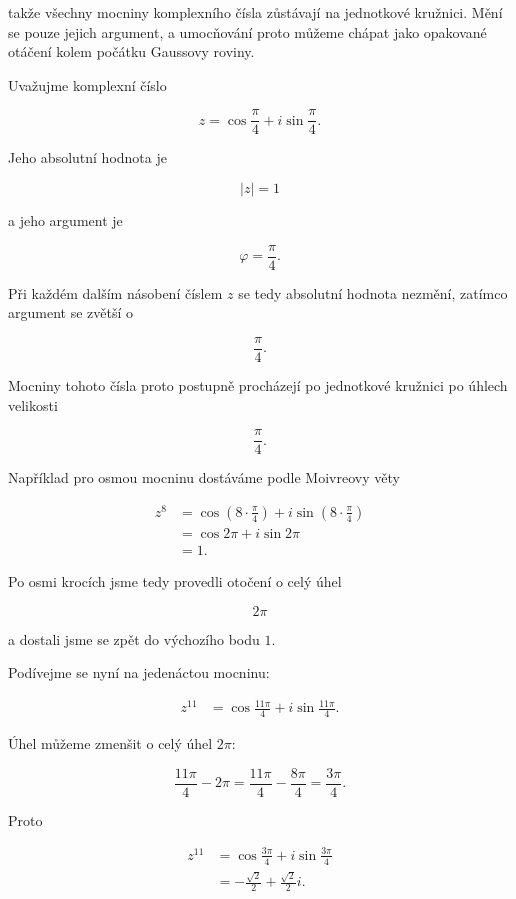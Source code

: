 \documentclass[12pt,a4paper]{article}
\begin{document}
takže všechny mocniny komplexního čísla zůstávají na jednotkové kružnici. Mění se
pouze jejich argument, a umocňování proto můžeme chápat jako opakované otáčení
kolem počátku Gaussovy roviny.


\begin{examplebox}

Uvažujme komplexní číslo

\[
    z=
    \cos\frac{\pi}{4}
    +
    i\sin\frac{\pi}{4}.
\]

Jeho absolutní hodnota je

\[
    |z|=1
\]

a jeho argument je

\[
    \varphi=\frac{\pi}{4}.
\]

Při každém dalším násobení číslem $z$ se tedy absolutní hodnota nezmění, zatímco
argument se zvětší o

\[
    \frac{\pi}{4}.
\]

Mocniny tohoto čísla proto postupně procházejí po jednotkové kružnici po úhlech
velikosti

\[
    \frac{\pi}{4}.
\]

Například pro osmou mocninu dostáváme podle Moivreovy věty

\begin{align*}
    z^8
    &=
    \cos\left(8\cdot\frac{\pi}{4}\right)
    +
    i\sin\left(8\cdot\frac{\pi}{4}\right)\\
    &=
    \cos2\pi+i\sin2\pi\\
    &=
    1.
\end{align*}

Po osmi krocích jsme tedy provedli otočení o celý úhel

\[
    2\pi
\]

a dostali jsme se zpět do výchozího bodu $1$.

Podívejme se nyní na jedenáctou mocninu:

\begin{align*}
    z^{11}
    &=
    \cos\frac{11\pi}{4}
    +
    i\sin\frac{11\pi}{4}.
\end{align*}

Úhel můžeme zmenšit o celý úhel $2\pi$:

\[
    \frac{11\pi}{4}-2\pi
    =
    \frac{11\pi}{4}-\frac{8\pi}{4}
    =
    \frac{3\pi}{4}.
\]

Proto

\begin{align*}
    z^{11}
    &=
    \cos\frac{3\pi}{4}
    +
    i\sin\frac{3\pi}{4}\\
    &=
    -\frac{\sqrt{2}}{2}
    +
    \frac{\sqrt{2}}{2}i.
\end{align*}


\end{examplebox}
\end{document}
